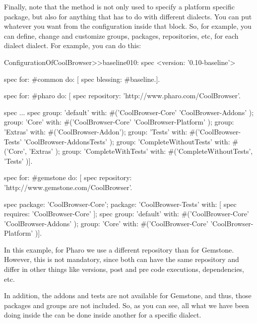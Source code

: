 \documentclass[a4paper,10pt,twoside]{book}
\begin{document}
    

Finally, note that the method  is not only used to specify a platform specific package, but also for anything that has to do with different dialects. You can put whatever you want from the configuration inside that block. So, for example, you can define, change and customize groups, packages, repositories, etc, for each dialect dialect. For example, you can do this:


  \begin{code}{}
 ConfigurationOfCoolBrowser>>baseline010: spec 
       <version: '0.10-baseline'>
       
       spec for: #common do: [
              spec blessing: #baseline.].
       
       spec for: #pharo do: [
              spec repository: 'http://www.pharo.com/CoolBrowser'.
              
              spec 
                     ...
              spec 
                     group: 'default' with: #('CoolBrowser-Core' 'CoolBrowser-Addons' );
                     group: 'Core' with: #('CoolBrowser-Core' 'CoolBrowser-Platform' );
                     group: 'Extras' with: #('CoolBrowser-Addon');
                     group: 'Tests' with: #('CoolBrowser-Tests' 'CoolBrowser-AddonsTests' );
                     group: 'CompleteWithoutTests' with: #('Core', 'Extras' );
                     group: 'CompleteWithTests' with: #('CompleteWithoutTests', 'Tests' )].
                     
       spec for: #gemstone do: [
              spec repository: 'http://www.gemstone.com/CoolBrowser'.
              
              spec 
                     package: 'CoolBrowser-Core';
                     package: 'CoolBrowser-Tests' with: [ spec requires: 'CoolBrowser-Core' ];
              spec 
                     group: 'default' with: #('CoolBrowser-Core' 'CoolBrowser-Addons' );
                     group: 'Core' with: #('CoolBrowser-Core' 'CoolBrowser-Platform' )].                     

\end{code}       
       
In this example, for Pharo we use a different repository than for Gemstone. However, this is not mandatory, since both can have the same repository and differ in other things like versions, post and pre code executions, dependencies, etc. 

In addition, the addons and tests are not available for Gemstone, and thus, those packages and groups are not included. So, as you can see, all what we have been doing inside the  can be done inside another  for a specific dialect. 
\end{document}
